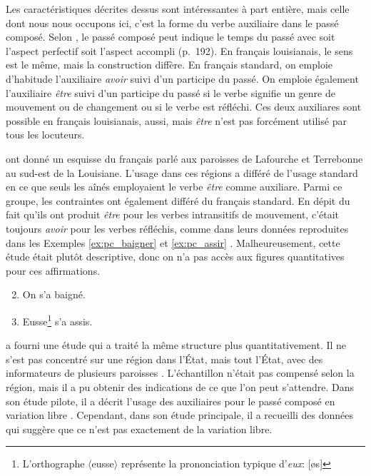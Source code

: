 \documentclass{article}
\newcommand{\lexi}[1]{\textit{#1}}
\newcommand{\orth}[1]{$\langle$#1$\rangle$}
\begin{document}
    Les caractéristiques décrites dessus sont intéressantes à part entière, mais celle dont nous nous occupons ici, c'est la forme du verbe auxiliaire dans le passé composé.
    Selon \textcite{luscher_emplois_1996}, le passé composé peut indique le temps du passé avec soit l'aspect perfectif soit l'aspect accompli (p.~192).
    En français louisianais, le sens est le même, mais la construction diffère.
    En français standard, on emploie d'habitude l'auxiliaire \lexi{avoir} suivi d'un participe du passé.
    On emploie également l'auxiliaire \lexi{être} suivi d'un participe du passé si le verbe signifie un genre de mouvement ou de changement ou si le verbe est réfléchi.
    Ces deux auxiliares sont possible en français louisianais, aussi, mais \lexi{être} n'est pas forcément utilisé par tous les locuteurs.

    \textcite{papen_structural_1997} ont donné un esquisse du français parlé aux paroisses de Lafourche et Terrebonne au sud-est de la Louisiane.
    L'usage dans ces régions a différé de l'usage standard en ce que seuls les aînés employaient le verbe \lexi{être} comme auxiliare.
    Parmi ce groupe, les contraintes ont également différé du français standard.
    En dépit du fait qu'ils ont produit \lexi{être} pour les verbes intransitifs de mouvement, c'était toujours \lexi{avoir} pour les verbes réfléchis, comme dans leurs données reproduites dans les Exemples \ref{ex:pc_baigner} et \ref{ex:pc_assir} \parencite[p.~101]{papen_structural_1997}.
    Malheureusement, cette étude était plutôt descriptive, donc on n'a pas accès aux figures quantitatives pour ces affirmations.

    \begin{enumerate}
      \setcounter{enumi}{1}
      \item \label{ex:pc_baigner} On s'a baigné.
      \item \label{ex:pc_assir} Eusse\footnote{L'orthographe \orth{eusse} représente la prononciation typique d'\lexi{eux}: [øs]} s'a assis.
    \end{enumerate}

    \textcite{byers_defining_1988} a fourni une étude qui a traité la même structure plus quantitativement.
    Il ne s'est pas concentré sur une région dans l'État, mais tout l'État, avec des informateurs de plusieurs paroisses \parencite[p.~47]{byers_defining_1988}.
    L'échantillon n'était pas compensé selon la région, mais il a pu obtenir des indications de ce que l'on peut s'attendre.
    Dans son étude pilote, il a décrit l'usage des auxiliaires pour le passé composé en variation libre \parencite[pp.~50-51]{byers_defining_1988}.
    Cependant, dans son étude principale, il a recueilli des données qui suggère que ce n'est pas exactement de la variation libre.
\end{document}
